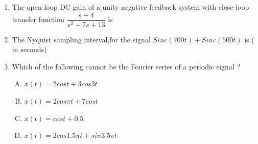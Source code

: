 \documentclass[journal,12pt,twocolumn]{IEEEtran}
\begin{document}
\begin{enumerate}
\begin{enumerate}[(A)]
\end{enumerate}

\item The open-loop DC gain of a unity negative feedback system with close-loop transfer function $\dfrac{s+4}{s^{2}+7s+13}$ is\\
\begin{enumerate}[(A)]
\end{enumerate}

\item The Nyquist sampling interval,for the signal $Sinc(700t)+Sinc(500t)$ is ( in seconds)

\begin{enumerate}[(A)]
\end{enumerate}

\item Which of the following cannot be the Fourier series of a periodic signal ?\\
\begin{enumerate}[(A)]
\setlength\itemsep{2em}

\item $
x(t)=2cos t + 3 cos 3t
$
\item $
x(t)=2 cos \pi t+7 cos t
$
\item $
x(t)=cos t +0.5
$
\item $
x(t)=2 cos 1.5\pi t +sin 3.5 \pi t
$
\end{enumerate}


\end{enumerate}
\end{document}
